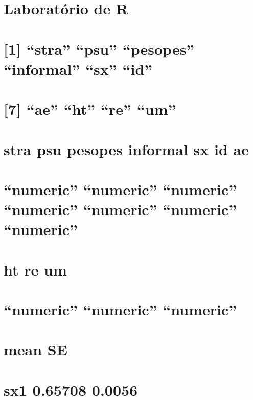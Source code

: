 \documentclass[]{book}
\theoremstyle{definition}
\theoremstyle{definition}
\theoremstyle{definition}
\theoremstyle{remark}
\begin{document}
\section{Laboratório de R}\label{laboratorio-de-r-5}

\section{\texorpdfstring{{[}1{]} ``stra'' ``psu'' ``pesopes''
``informal'' ``sx''
``id''}{{[}1{]} stra psu pesopes informal sx id}}\label{stra-psu-pesopes-informal-sx-id-1}

\section{\texorpdfstring{{[}7{]} ``ae'' ``ht'' ``re''
``um''}{{[}7{]} ae ht re um}}\label{ae-ht-re-um-1}

\section{stra psu pesopes informal sx id
ae}\label{stra-psu-pesopes-informal-sx-id-ae-1}

\section{\texorpdfstring{``numeric'' ``numeric'' ``numeric'' ``numeric''
``numeric'' ``numeric''
``numeric''}{numeric numeric numeric numeric numeric numeric numeric}}\label{numeric-numeric-numeric-numeric-numeric-numeric-numeric-1}

\section{ht re um}\label{ht-re-um-1}

\section{\texorpdfstring{``numeric'' ``numeric''
``numeric''}{numeric numeric numeric}}\label{numeric-numeric-numeric-1}

\section{mean SE}\label{mean-se}

\section{sx1 0.65708 0.0056}\label{sx1-0.65708-0.0056}
\end{document}
